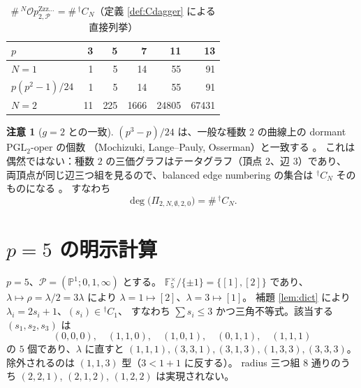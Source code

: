 \documentclass[a4paper,11pt]{ltjsarticle}
\theoremstyle{plain}
\theoremstyle{definition}
\newtheorem{remark}[theorem]{注意}
\newcommand{\bbP}{\mathbb{P}}
\newcommand{\bbF}{\mathbb{F}}
\newcommand{\sP}{\mathscr{P}}
\newcommand{\Op}{\mathcal{O}p}
\newcommand{\Zzz}{\mathrm{Zzz\dots}}
\begin{document}
\begin{table}[htbp]
\centering
\caption{$\#\,{}^N\Op^{\Zzz}_{2,\sP}=\#\,{}^{\dagger}C_N$（定義 \ref{def:Cdagger} による直接列挙）}
\label{tab:count}
\begin{tabular}{lrrrrr}
\toprule
$p$ & 3 & 5 & 7 & 11 & 13\\
\midrule
$N=1$ & 1 & 5 & 14 & 55 & 91\\
$p(p^2-1)/24$ & 1 & 5 & 14 & 55 & 91\\
$N=2$ & 11 & 225 & 1666 & 24805 & 67431\\
\bottomrule
\end{tabular}
\end{table}

\begin{remark}[$g=2$ との一致]\label{rem:genus2}
$(p^3-p)/24$ は、一般な種数 $2$ の曲線上の dormant $\mathrm{PGL}_2$-oper の個数
（Mochizuki, Lange--Pauly, Osserman）と一致する \cite[(1.2)]{Wak2}。
これは偶然ではない：種数 $2$ の三価グラフはテータグラフ（頂点 $2$、辺 $3$）であり、
両頂点が同じ辺三つ組を見るので、balanced edge numbering の集合は
${}^{\dagger}C_N$ そのものになる \cite[Thm.~E]{Wak2}。
すなわち
\[
  \deg\bigl(\Pi_{2,N,\emptyset,2,0}\bigr)=\#\,{}^{\dagger}C_N .
\]
\end{remark}

\section{$p=5$ の明示計算}\label{sec:p5}

$p=5$、$\sP=(\bbP^1;0,1,\infty)$ とする。
$\bbF_5^\times/\{\pm1\}=\{[1],[2]\}$ であり、
$\lambda\mapsto\rho=\lambda/2=3\lambda$ により
$\lambda=1\mapsto[2]$、$\lambda=3\mapsto[1]$。
補題 \ref{lem:dict} により $\lambda_i=2s_i+1$、$(s_i)\in{}^{\dagger}C_1$、
すなわち $\sum s_i\le3$ かつ三角不等式。該当する $(s_1,s_2,s_3)$ は
\[
  (0,0,0),\quad(1,1,0),\quad(1,0,1),\quad(0,1,1),\quad(1,1,1)
\]
の $5$ 個であり、$\lambda$ に直すと
$(1,1,1),(3,3,1),(3,1,3),(1,3,3),(3,3,3)$。
除外されるのは $(1,1,3)$ 型（$3<1+1$ に反する）。
radius 三つ組 $8$ 通りのうち $(2,2,1)$, $(2,1,2)$, $(1,2,2)$ は実現されない。
\end{document}
